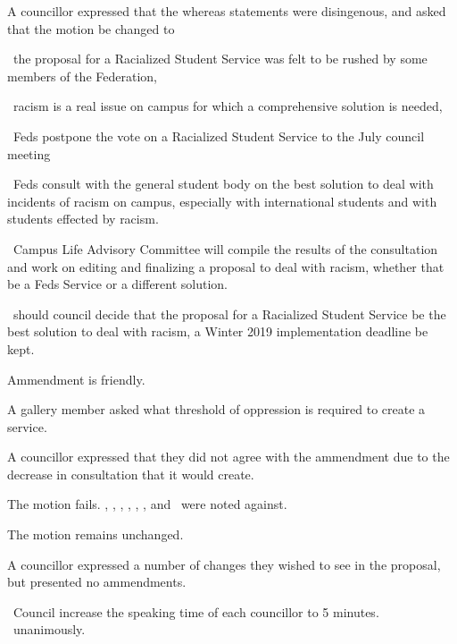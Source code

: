 \begin{motion}
\begin{motion}
        A councillor expressed that the whereas statements were disingenous,
        and asked that the motion be changed to
        \begin{motion}
            \whereas\ the proposal for a Racialized Student Service was felt to
            be rushed by some members of the Federation,

            \whereas\ racism is a real issue on campus for which a comprehensive
            solution is needed,

            \birt\ Feds postpone the vote on a Racialized Student Service to the
            July council meeting

            \bifrt\ Feds consult with the general student body on the best solution
            to deal with incidents of racism on campus, especially with
            international students and with students effected by racism.

            \bifrt\ Campus Life Advisory Committee will compile the results of the
            consultation and work on editing and finalizing a proposal to deal with
            racism, whether that be a Feds Service or a different solution.

            \bifrt\ should council decide that the proposal for a Racialized
            Student Service be the best solution to deal with racism, a Winter 2019
            implementation deadline be kept.

            \movers{\stephanie}{\alexander}

            Ammendment is friendly.
        \end{motion}

        A gallery member asked what threshold of oppression is required to
        create a service.

        A councillor expressed that they did not agree with the ammendment due
        to the decrease in consultation that it would create.

        The motion fails. \katie, \jennifer, \seneca, \nickta, \rebecca, \cai,
        and \stephanie\ were noted against.

    \end{motion}

    The motion remains unchanged.

    A councillor expressed a number of changes they wished to see in the
    proposal, but presented no ammendments.

    \begin{motion}
        \birt\ Council increase the speaking time of each councillor to 5
        minutes.
        \movers{\seneca}{\cai}
        \carries\ unanimously.
    \end{motion}


\end{motion}
